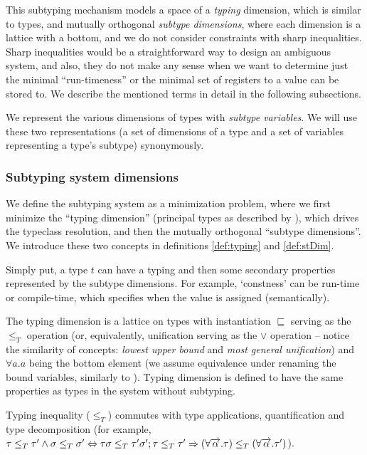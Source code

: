 This subtyping mechanism models a space of a \emph{typing} dimension, which is similar to types, and mutually orthogonal \emph{subtype dimensions}, where each dimension is a lattice with a bottom, and we do not consider constraints with sharp inequalities. Sharp inequalities would be a straightforward way to design an ambiguous system, and also, they do not make any sense when we want to determine just the minimal ``run-timeness'' or the minimal set of registers to a value can be stored to. We describe the mentioned terms in detail in the following subsections.

We represent the various dimensions of types with \emph{subtype variables}. We will use these two representations (a set of dimensions of a type and a set of variables representing a type's subtype) synonymously.

\subsubsection{Subtyping system dimensions}

We define the subtyping system as a minimization problem, where we first minimize the ``typing dimension'' (principal types as described by \citet{damas1982principal}), which drives the typeclass resolution, and then the mutually orthogonal ``subtype dimensions''. We introduce these two concepts in definitions \ref{def:typing} and \ref{def:stDim}.

Simply put, a type $t$ can have a typing  and then some secondary properties represented by the subtype dimensions. For example, `constness' can be run-time or compile-time, which specifies when the value is assigned (semantically).

\begin{defn}
    \label{def:typing}
    The typing dimension is a lattice on types with instantiation $\sqsubseteq$ serving as the $\leq_T$ operation (or, equivalently, unification serving as the $\lor$ operation -- notice the similarity of concepts: \emph{lowest upper bound} and \emph{most general unification}) and $\forall a . a$ being the bottom element (we assume equivalence under renaming the bound variables, similarly to \citet{barendregt1992lambda}). Typing dimension is defined to have the same properties as types in the system without subtyping.

    Typing inequality ($\leq_T$) commutes with type applications, quantification and type decomposition (for example, $\tau \leq_T \tau' \land \sigma \leq_T \sigma' \Leftrightarrow \tau \sigma \leq_T \tau' \sigma'; \tau \leq_T \tau' \Rightarrow (\forall \overrightarrow{\alpha} . \tau) \leq_T (\forall \overrightarrow{\alpha} . \tau')$).

\end{defn}

